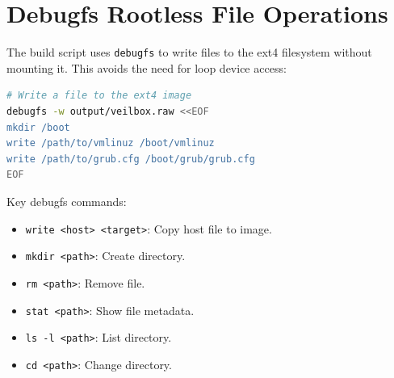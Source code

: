 \section{Debugfs Rootless File Operations}

The build script uses \texttt{debugfs} to write files to the ext4
filesystem without mounting it. This avoids the need for loop device
access:

\begin{lstlisting}[language=bash]
# Write a file to the ext4 image
debugfs -w output/veilbox.raw <<EOF
mkdir /boot
write /path/to/vmlinuz /boot/vmlinuz
write /path/to/grub.cfg /boot/grub/grub.cfg
EOF
\end{lstlisting}

Key debugfs commands:
\begin{itemize}[nosep]
  \item \texttt{write <host> <target>}: Copy host file to image.
  \item \texttt{mkdir <path>}: Create directory.
  \item \texttt{rm <path>}: Remove file.
  \item \texttt{stat <path>}: Show file metadata.
  \item \texttt{ls -l <path>}: List directory.
  \item \texttt{cd <path>}: Change directory.
\end{itemize}
